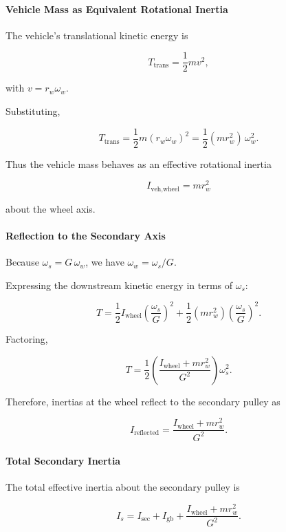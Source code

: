 \documentclass[11pt]{article}
\numberwithin{equation}{section}
\begin{document}
\paragraph{Vehicle Mass as Equivalent Rotational Inertia}

The vehicle’s translational kinetic energy is

\[
T_{\text{trans}}
=
\frac12 m v^2,
\]

with $v = r_w \omega_w$.

Substituting,

\[
T_{\text{trans}}
=
\frac12 m (r_w \omega_w)^2
=
\frac12 (m r_w^2)\,\omega_w^2.
\]

Thus the vehicle mass behaves as an effective rotational inertia

\[
I_{\text{veh,wheel}} = m r_w^2
\]

about the wheel axis.

\paragraph{Reflection to the Secondary Axis}

Because $\omega_s = G\,\omega_w$,
we have $\omega_w = \omega_s/G$.

Expressing the downstream kinetic energy in terms of $\omega_s$:

\[
T
=
\frac12 I_{\text{wheel}} \left(\frac{\omega_s}{G}\right)^2
+
\frac12 (m r_w^2) \left(\frac{\omega_s}{G}\right)^2.
\]

Factoring,

\[
T
=
\frac12
\left(
\frac{I_{\text{wheel}} + m r_w^2}{G^2}
\right)
\omega_s^2.
\]

Therefore, inertias at the wheel reflect to the secondary pulley as

\[
I_{\text{reflected}}
=
\frac{I_{\text{wheel}} + m r_w^2}{G^2}.
\]

\paragraph{Total Secondary Inertia}

The total effective inertia about the secondary pulley is

\begin{equation}
I_s
=
I_{\text{sec}}
+
I_{\text{gb}}
+
\frac{I_{\text{wheel}} + m r_w^2}{G^2}.
\label{eq:Is_def}
\end{equation}
\end{document}
